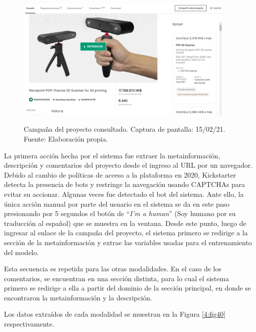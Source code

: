 \begin{figure}[!ht]
	\begin{center}
		\includegraphics[width=0.95\textwidth]{4/figures/example_project_150221.jpg}
		\caption[Campaña del proyecto consultado. Captura de pantalla: 15/02/21]{Campaña del proyecto consultado. Captura de pantalla: 15/02/21.\\
			Fuente: Elaboración propia.}
		\vspace{-0.5cm}
		\label{4:fig39}
	\end{center}
\end{figure}

La primera acción hecha por el sistema fue extraer la metainformación, descripción y comentarios del proyecto desde el ingreso al URL por un navegador. Debido al cambio de políticas de acceso a la plataforma en 2020, Kickstarter detecta la presencia de bots y restringe la navegación usando CAPTCHAs para evitar su accionar. Algunas veces fue detectado el bot del sistema. Ante ello, la única acción manual por parte del usuario en el sistema se da en este paso presionando por 5 segundos el botón de “\textit{I'm a human}” (Soy humano por su traducción al español) que se muestra en la ventana. Desde este punto, luego de ingresar al enlace de la campaña del proyecto, el sistema primero se redirige a la sección de la metainformación y extrae las variables usadas para el entrenamiento del modelo.

Esta secuencia es repetida para las otras modalidades. En el caso de los comentarios, se encuentran en una sección distinta, para lo cual el sistema primero se redirige a ella a partir del dominio de la sección principal, en donde se encontraron la metainformación y la descripción.

Los datos extraídos de cada modalidad se muestran en la Figura \ref{4:fig40} respectivamente.

